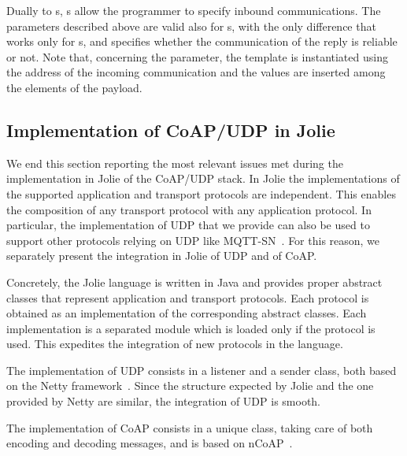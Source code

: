 Dually to s, s allow the programmer
to specify inbound communications. The parameters described above are valid also
for s, with the only difference that
 works only for s, and
specifies whether the communication of the reply is reliable or not. 
%
Note that, concerning the  parameter, the template is instantiated
using the address of the incoming communication and the values are inserted
among the elements of the payload.

\subsection{Implementation of CoAP/UDP in Jolie} %
%
We end this section reporting the most relevant issues met during the
implementation in Jolie of the CoAP/UDP stack.
%
In Jolie the implementations of the supported application and transport
protocols are independent. This enables the composition of any transport
protocol with any application protocol. In particular, the implementation of UDP
that we provide can also be used to support other protocols relying on UDP like
MQTT-SN~\cite{hunkeler08}. For this reason, we separately
present the integration in Jolie of UDP and of CoAP.

Concretely, the Jolie language is written in Java and provides proper abstract
classes that represent application and transport protocols. Each protocol is
obtained as an implementation of the corresponding abstract classes. Each
implementation is a separated module which is loaded only if the protocol is
used. This expedites the integration of new protocols in the language.

%
The implementation of UDP consists in a listener and a
sender class, both based on the Netty framework~\cite{maurer16}.
Since the structure expected by Jolie and the one provided by Netty are similar,
the integration of UDP is smooth. 

The implementation of CoAP consists in a unique class, taking care
of both encoding and decoding messages, and is based on nCoAP~\cite{ncoap}.

